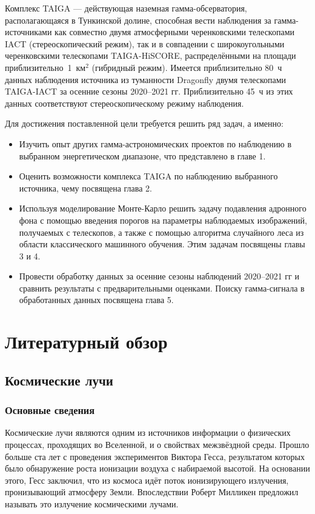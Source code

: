 \documentclass[magd,floatypics,numeref]{msudipl} %
\begin{document}
Комплекс TAIGA --- действующая наземная гамма-обсерватория, располагающаяся в Тункинской долине, способная вести наблюдения за гамма-источниками как совместно двумя атмосферными черенковскими телескопами IACT (стереоскопический режим), так и в совпадении с широкоугольными черенковскими телескопами TAIGA-HiSCORE, распределёнными на площади приблизительно~1~$\text{км}^{\text{2}}$ (гибридный режим).
Имеется приблизительно 80~ч данных наблюдения источника из туманности Dragonfly двумя телескопами TAIGA-IACT за осенние сезоны 2020--2021 гг. Приблизительно 45~ч из этих данных соответствуют стереоскопическому режиму наблюдения.

Для достижения поставленной цели требуется решить ряд задач, а именно:
\begin{itemize}
\item Изучить опыт других гамма-астрономических проектов по наблюдению в выбранном энергетическом диапазоне, что представлено в главе 1. 
\item Оценить возможности комплекса TAIGA  по наблюдению выбранного источника, чему посвящена глава 2. 
\item Используя моделирование Монте-Карло решить задачу подавления адронного фона с помощью введения порогов на параметры наблюдаемых изображений, получаемых с телескопов, а также с помощью алгоритма случайного леса из области классического машинного обучения. Этим задачам посвящены главы 3 и 4.
\item Провести обработку данных за осенние сезоны наблюдений 2020--2021 гг и сравнить результаты с предварительными оценками. Поиску гамма-сигнала в обработанных данных посвящена глава 5. 
\end{itemize}


\chapter{Литературный обзор}
\section{Космические лучи}
\subsection{Основные сведения}
Космические лучи являются одним из источников информации о физических процессах, проходящих во Вселенной, и о свойствах межзвёздной среды. Прошло больше ста лет с проведения экспериментов Виктора Гесса, результатом которых было обнаружение роста ионизации воздуха с набираемой высотой. На основании этого, Гесс заключил, что из космоса идёт поток ионизирующего излучения, пронизывающий атмосферу Земли. Впоследствии Роберт Милликен предложил называть это излучение космическими лучами.
\end{document}
